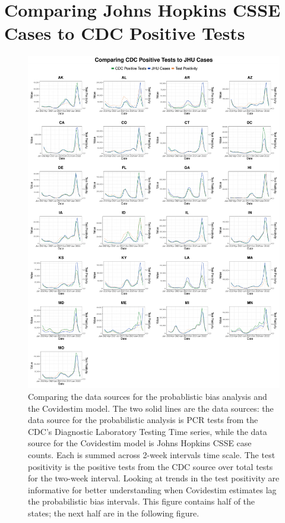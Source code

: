 \documentclass[12pt,twoside]{smiththesis}
\begin{document}
\hypertarget{comparing-johns-hopkins-csse-cases-to-cdc-positive-tests}{%
\section{Comparing Johns Hopkins CSSE Cases to CDC Positive Tests}\label{comparing-johns-hopkins-csse-cases-to-cdc-positive-tests}}
\begin{figure}

{\centering \includegraphics[width=1\linewidth]{figure/jhu_cdc_all_states_1} 

}

\caption{\label{fig:jhu-cdc-all}Comparing the data sources for the probablistic bias analysis and the Covidestim model. The two solid lines are the data sources: the data source for the probabilistic analysis is PCR tests from the CDC's Diagnostic Laboratory Testing Time series, while the data source for the Covidestim model is Johns Hopkins CSSE case counts. Each is summed across 2-week intervals time scale. The test positivity is the positive tests from the CDC source over total tests for the two-week interval. Looking at trends in the test positivity are informative for better understanding when Covidestim estimates lag the probabilistic bias intervals. This figure contains half of the states; the next half are in the following figure.}\label{fig:unnamed-chunk-114}
\end{figure}
\end{document}
